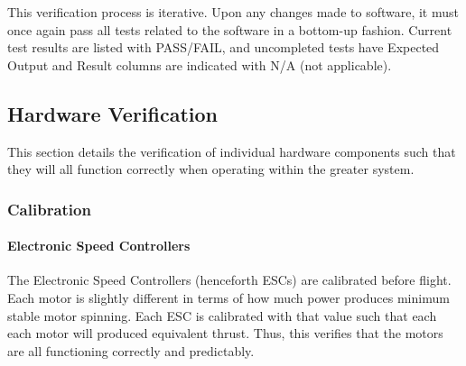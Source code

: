 \documentclass[10pt,letterpaper]{article}
\begin{document}
This verification process is iterative. Upon any changes made to software, it must once again pass all tests related to the software in a bottom-up fashion. Current test results are listed with PASS/FAIL, and uncompleted tests have Expected Output and Result columns are indicated with N/A (not applicable).



\subsection{Hardware Verification}
This section details the verification of individual hardware components such that they will all function correctly when operating within the greater system.

\subsubsection{Calibration}

\paragraph{Electronic Speed Controllers}
The Electronic Speed Controllers (henceforth ESCs) are calibrated before flight. Each motor is slightly different in terms of how much power produces minimum stable motor spinning. Each ESC is calibrated with that value such that each each motor will produced equivalent thrust. Thus, this verifies that the motors are all functioning correctly and predictably.
\end{document}

